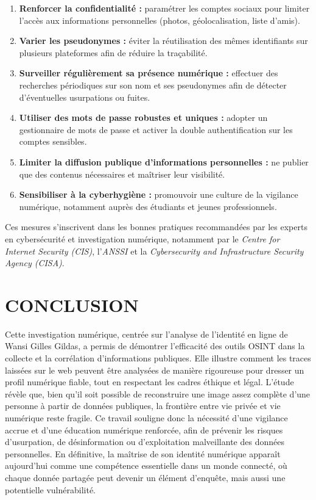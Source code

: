 \documentclass[memoire, 12pt]{report}
\begin{document}
\begin{enumerate}[label=\arabic*.]
    \item \textbf{Renforcer la confidentialité :} paramétrer les comptes sociaux pour limiter l’accès aux informations personnelles (photos, géolocalisation, liste d’amis).
    \item \textbf{Varier les pseudonymes :} éviter la réutilisation des mêmes identifiants sur plusieurs plateformes afin de réduire la traçabilité.
    \item \textbf{Surveiller régulièrement sa présence numérique :} effectuer des recherches périodiques sur son nom et ses pseudonymes afin de détecter d’éventuelles usurpations ou fuites.
    \item \textbf{Utiliser des mots de passe robustes et uniques :} adopter un gestionnaire de mots de passe et activer la double authentification sur les comptes sensibles.
    \item \textbf{Limiter la diffusion publique d’informations personnelles :} ne publier que des contenus nécessaires et maîtriser leur visibilité.
    \item \textbf{Sensibiliser à la cyberhygiène :} promouvoir une culture de la vigilance numérique, notamment auprès des étudiants et jeunes professionnels.
\end{enumerate}

Ces mesures s’inscrivent dans les bonnes pratiques recommandées par les experts en cybersécurité et investigation numérique, notamment par le \textit{Centre for Internet Security (CIS)}, l’\textit{ANSSI} et la \textit{Cybersecurity and Infrastructure Security Agency (CISA)}.




\newpage
\section*{CONCLUSION}
Cette investigation numérique, centrée sur l’analyse de l’identité en ligne de Wansi Gilles Gildas, a permis de démontrer l’efficacité des outils OSINT dans la collecte et la corrélation d’informations publiques. Elle illustre comment les traces laissées sur le web peuvent être analysées de manière rigoureuse pour dresser un profil numérique fiable, tout en respectant les cadres éthique et légal. L’étude révèle que, bien qu’il soit possible de reconstruire une image assez complète d’une personne à partir de données publiques, la frontière entre vie privée et vie numérique reste fragile. Ce travail souligne donc la nécessité d’une vigilance accrue et d’une éducation numérique renforcée, afin de prévenir les risques d’usurpation, de désinformation ou d’exploitation malveillante des données personnelles. En définitive, la maîtrise de son identité numérique apparaît aujourd’hui comme une compétence essentielle dans un monde connecté, où chaque donnée partagée peut devenir un élément d’enquête, mais aussi une potentielle vulnérabilité.
\end{document}
